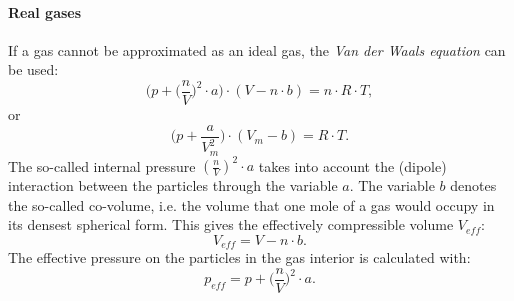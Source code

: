 \documentclass[10pt,a4paper]{article}
\begin{document}
\paragraph{Real gases}
If a gas cannot be approximated as an ideal gas, the \textit{Van der Waals equation} can be used:
\begin{equation}
\bigg(p+ \Big(\frac{n}{V}\Big)^2 \cdot a\bigg) \cdot (V - n \cdot b) = n \cdot R \cdot T,
\end{equation}
or
\begin{equation}
\bigg(p+ \frac{a}{V_{m}^2}\bigg) \cdot (V_m - b) =  R \cdot T.
\end{equation}
The so-called internal pressure $(\frac{n}{V})^2 \cdot a$ takes into account the (dipole) interaction between the particles through the variable $a$. The variable $b$ denotes the so-called co-volume, i.e. the volume that one mole of a gas would occupy in its densest spherical form. This gives the effectively compressible volume $V_{eff}$:
\begin{equation}
    V_{eff} = V - n \cdot b.
\end{equation}The effective pressure on the particles in the gas interior is calculated with:
\begin{equation}
p_{eff} = p + \Big(\frac{n}{V}\Big)^2 \cdot a.
\end{equation}
\end{document}
